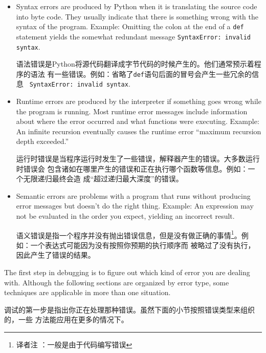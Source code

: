 \documentclass[10pt]{book}
\begin{document}
\begin{CJK}{UTF8}{gbsn}
\begin{itemize}

\item Syntax errors are produced by Python when it is translating the
  source code into byte code.  They usually indicate that there is
  something wrong with the syntax of the program.  Example: Omitting
  the colon at the end of a {\tt def} statement yields the somewhat
  redundant message {\tt SyntaxError: invalid syntax}.

  语法错误是Python将源代码翻译成字节代码的时候产生的。他们通常预示着程序的语法
  有一些错误。例如：省略了{\tt def}语句后面的冒号会产生一些冗余的信息 {\tt
  SyntaxError: invalid syntax}.

\item Runtime errors are produced by the interpreter if something goes
  wrong while the program is running.  Most runtime error messages
  include information about where the error occurred and what
  functions were executing.  Example: An infinite recursion eventually
  causes the runtime error ``maximum recursion depth exceeded.''

  运行时错误是当程序运行时发生了一些错误，解释器产生的错误。大多数运行时错误会
  包含诸如在哪里产生的错误和正在执行哪个函数等信息。例如：一个无限递归最终会造
  成``超过递归最大深度''的错误。

\item Semantic errors are problems with a program that runs without
  producing error messages but doesn't do the right thing.  Example:
  An expression may not be evaluated in the order you expect, yielding
  an incorrect result.

  语义错误是指一个程序并没有抛出错误信息，但是没有做正确的事情\footnote{译者注
  ：一般是由于代码编写错误}。例如：一个表达式可能因为没有按照你预期的执行顺序而
  被略过了没有执行，因此产生了错误的结果。

\end{itemize}

The first step in debugging is to figure out which kind of
error you are dealing with.  Although the following sections are
organized by error type, some techniques are
applicable in more than one situation.

调试的第一步是指出你正在处理那种错误。虽然下面的小节按照错误类型来组织的，一些
方法能应用在更多的情况下。


\end{CJK}
\end{document}
